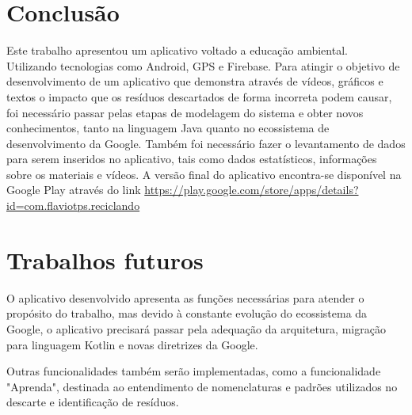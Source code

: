 \documentclass[
	12pt,				%
	openany,			%
	twoside,			%
	a4paper,			%
	english,			%
	french,				%
	spanish,			%
	brazil				%
	]{abntex2}
\begin{document}
\chapter{Conclusão}
Este trabalho apresentou um aplicativo voltado a educação ambiental.  Utilizando tecnologias como Android, GPS e Firebase. Para atingir o objetivo de desenvolvimento de um aplicativo que demonstra através de vídeos, gráficos e textos o impacto que os resíduos descartados de forma incorreta podem causar, foi necessário passar pelas etapas de modelagem do sistema e obter novos conhecimentos, tanto na linguagem Java quanto no ecossistema de desenvolvimento da Google. Também foi necessário fazer o levantamento de dados para serem inseridos no aplicativo, tais como dados estatísticos, informações sobre os materiais e vídeos. A versão final do aplicativo encontra-se disponível na Google Play através do link \href{https://play.google.com/store/apps/details?id=com.flaviotps.reciclando}{https://play.google.com/store/apps/details?id=com.flaviotps.reciclando}

\chapter{Trabalhos futuros}
O aplicativo desenvolvido apresenta as funções necessárias para atender o propósito do trabalho, mas devido à constante evolução do ecossistema da Google, o aplicativo precisará passar pela adequação da arquitetura, migração para linguagem Kotlin e novas diretrizes da Google.

Outras funcionalidades também serão implementadas, como a funcionalidade "Aprenda", destinada ao entendimento de nomenclaturas e padrões utilizados no descarte e identificação de resíduos.


\postextual








%
%
\end{document}
